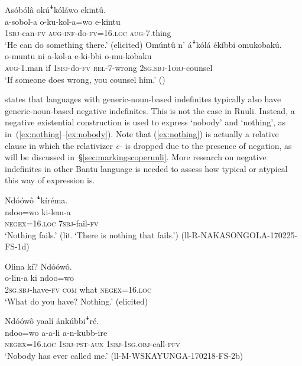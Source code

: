 \documentclass[output=paper,colorlinks,citecolor=brown,draftmode]{langscibook}
\begin{document}
\ea \label{ex:negindefinites}
\begin{xlist}
	\ex \label{ex:something}
	\glll  Asóbólâ okúꜜkóláwo ekintû.\\
	        a-sobol-a o-ku-kol-a=wo e-kintu\\
	    	\textsc{1sbj}-can-\textsc{fv} \textsc{aug}-\textsc{inf}-do-\textsc{fv}=16.\textsc{loc} \textsc{aug}-7.thing\\
	\glt ‘He can do something there.'  (elicited)
\ex \label{ex:somebody}
	\glll    Omúntû n’ áꜜkólá ékíbbi omukobakú.\\
	        o-muntu ni a-kol-a e-ki-bbi o-mu-kobaku\\ 
	    	\textsc{aug}-1.man if \textsc{1sbj}-do-\textsc{fv} \textsc{rel}-7-wrong \textsc{2sg.sbj}-1\textsc{obj}-counsel\\
	\glt ‘If someone does wrong, you counsel him.' (\citealt[412]{NamyaloEtAl2021})
\end{xlist}
\z

\citet{Haspelmath2013-wals115} states that languages with generic-noun-based indefinites typically also have generic-noun-based negative indefinites. This is not the case in Ruuli. 
Instead, a negative existential construction is used to express `nobody' and `nothing', as in~(\ref{ex:nothing}--\ref{ex:nobody}).
Note that (\ref{ex:nothing}) is actually a relative clause in which the relativizer \textit{e-} is dropped due to the presence of negation, as will be discussed in~§\ref{sec:markingscoperuuli}. More research on negative indefinites in other Bantu language is needed to assess how typical or atypical this way of expression is.

\ea \label{ex:negindefinites2}\label{ex:ruulietal:33}
\begin{xlist}
\ex \label{ex:nothing}
	\glll   Ndóówô ꜜkíréma.\\
	        ndoo=wo ki-lem-a\\
		    \textsc{negex}=16.\textsc{loc} \textsc{7sbj}-fail-\textsc{fv}\\
	\glt    ‘Nothing fails.' (lit.\,`There is nothing that fails.') (ll-R-NAKASONGOLA-170225-FS-1d)

\ex \label{ex:nothingdoppelt}
	\glll   Olina kí? Ndóówô.\\
	        o-lin-a ki ndoo=wo\\ 
		    \textsc{2sg.sbj}-have-\textsc{fv} \textsc{com} what \textsc{negex}=16.\textsc{loc}\\
	\glt    ‘What do you have? Nothing.'  (elicited)

\ex \label{ex:nobody}
	\glll   Ndóówô yaalí ánkúbbiꜜré.\\
	        ndoo=wo a-a-li a-n-kubb-ire\\ 
	    	\textsc{negex}=16.\textsc{loc} \textsc{1sbj}-\textsc{pst}-\textsc{aux} \textsc{1sbj}-\textsc{1sg.obj}-call-\textsc{pfv}\\
	\glt ‘Nobody has ever called me.' (ll-M-WSKAYUNGA-170218-FS-2b)
\end{xlist}
\z
\end{document}
